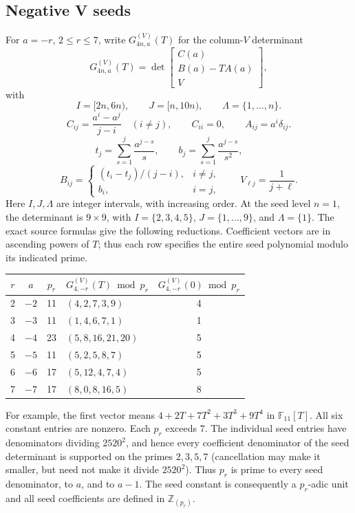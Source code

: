 \subsection{Negative V seeds}

For $a=-r$, $2\le r\le7$, write $G^{(V)}_{4n,a}(T)$ for the
column-$V$ determinant
\[
 G^{(V)}_{4n,a}(T)=\det\begin{bmatrix}C(a)\\ B(a)-TA(a)\\ V\end{bmatrix},
\]
with
\[
 I=[2n,6n),\qquad J=[n,10n),\qquad
 \Lambda=\{1,\ldots,n\}.
\]
\[
 C_{ij}=\frac{a^i-a^j}{j-i}\quad(i\ne j),\qquad C_{ii}=0,
 \qquad A_{ij}=a^i\delta_{ij}.
\]
\[
 t_j=\sum_{s=1}^j\frac{a^{j-s}}s,\qquad
 b_j=\sum_{s=1}^j\frac{a^{j-s}}{s^2},\qquad
 \]
 \[
 B_{ij}=\begin{cases}(t_i-t_j)/(j-i),&i\ne j,\\ b_i,&i=j,\end{cases}
 \qquad V_{\ell j}=\frac1{j+\ell}.
\]
Here $I,J,\Lambda$ are integer intervals, with increasing order.  At the seed
level $n=1$, the determinant is $9\times9$, with
$I=\{2,3,4,5\}$, $J=\{1,\ldots,9\}$, and $\Lambda=\{1\}$.
The exact source formulas give the following reductions.  Coefficient vectors
are in ascending powers of $T$; thus each row specifies the entire seed
polynomial modulo its indicated prime.
\begin{center}\normalsize\renewcommand{\arraystretch}{1.12}
\begin{tabular}{c c c l c}
\hline
$r$&$a$&$p_r$&$G^{(V)}_{4,-r}(T)\bmod p_r$&$G^{(V)}_{4,-r}(0)\bmod p_r$\\
\hline
2&$-2$&11&$(4,2,7,3,9)$&4\\
3&$-3$&11&$(1,4,6,7,1)$&1\\
4&$-4$&23&$(5,8,16,21,20)$&5\\
5&$-5$&11&$(5,2,5,8,7)$&5\\
6&$-6$&17&$(5,12,4,7,4)$&5\\
7&$-7$&17&$(8,0,8,16,5)$&8\\
\hline
\end{tabular}
\end{center}
For example, the first vector means
$4+2T+7T^2+3T^3+9T^4$ in $\mathbb F_{11}[T]$.  All six constant entries
are nonzero.  Each $p_r$ exceeds $7$.  The individual seed entries have
denominators dividing $2520^2$, and hence every coefficient denominator of
the seed determinant is supported on the primes $2,3,5,7$ (cancellation may
make it smaller, but need not make it divide $2520^2$).  Thus $p_r$ is prime
to every seed denominator, to $a$, and to $a-1$.  The seed constant is
consequently a $p_r$-adic unit and all seed coefficients are defined in
$\mathbb Z_{(p_r)}$.

